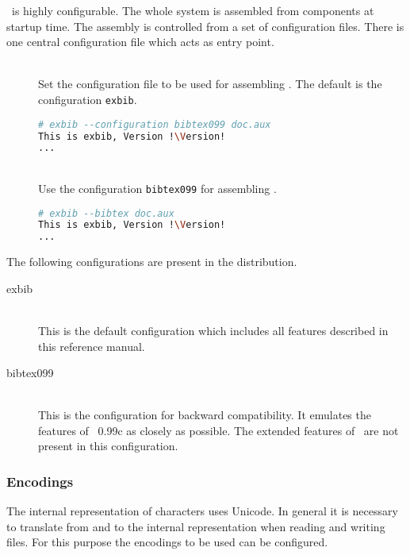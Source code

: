 \ExBib\ is highly configurable. The whole system is assembled from
components at startup time. The assembly is controlled from a set of
configuration files. There is one central configuration file which
acts as entry point.

\begin{description}
\item[ ]
\item[ ]\ \\
  Set the configuration file to be used for assembling \ExBib. The
  default is the configuration \texttt{exbib}.
  \begin{lstlisting}[language=sh,escapechar=!]
# exbib --configuration bibtex099 doc.aux
This is exbib, Version !\Version!
...
\end{lstlisting}

\item[]
\item[]\ \\
  Use the configuration \texttt{bibtex099} for assembling \ExBib.
\begin{lstlisting}[language=sh,escapechar=!]
# exbib --bibtex doc.aux
This is exbib, Version !\Version!
...
\end{lstlisting}
\end{description}

The following configurations are present in the distribution.

\begin{description}
\item[exbib]\ \\
  This is the default configuration which includes all features
  described in this reference manual.
\item[bibtex099]\ \\
  This is the configuration for backward compatibility. It emulates
  the features of \BibTeX~0.99c as closely as possible. The extended
  features of \ExBib\ are not present in this configuration.
\end{description}


\subsubsection{Encodings}%
\label{sec:encodings}%

The internal representation of characters uses Unicode.
In general it is necessary to translate from and to the internal
representation when reading and writing files. For this purpose the
encodings to be used can be configured.


